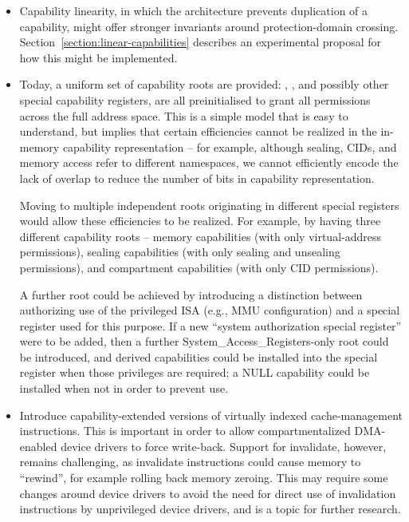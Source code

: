 \begin{itemize}
\item Capability linearity, in which the architecture prevents duplication of
  a capability, might offer stronger invariants around protection-domain
  crossing.
  Section~\ref{section:linear-capabilities} describes an experimental proposal
  for how this might be implemented.

\item Today, a uniform set of capability roots are provided: \PCC{}, \DDC{},
  and possibly other special capability registers, are all
  preinitialised to grant all permissions across the full address space.
  This is a simple model that is easy to understand, but implies that certain
  efficiencies cannot be realized in the in-memory capability representation --
  for example, although sealing, CIDs, and memory access refer to different
  namespaces, we cannot efficiently encode
the
  lack of overlap to reduce the number of bits in capability representation.

  Moving to multiple independent roots originating in different special
  registers would allow these efficiencies to be realized.
  For example, by having three different capability roots -- memory
  capabilities (with only virtual-address permissions), sealing capabilities
  (with only sealing and unsealing permissions), and compartment capabilities
  (with only CID permissions).

  A further root could be achieved by introducing a distinction between \PCC{}
  authorizing use of the privileged ISA (e.g., MMU configuration) and a special
  register used for this purpose.
  If a new ``system authorization special register'' were to be added, then a
  further System\_Access\_Registers-only root could be introduced, and derived
  capabilities could be installed into the special register when those
  privileges are required; a NULL capability could be installed when not in
  order to prevent use.

\item Introduce capability-extended versions of virtually indexed
  cache-management instructions.
  This is important in order to allow compartmentalized DMA-enabled device
  drivers to force write-back.
  Support for invalidate, however, remains challenging, as invalidate
  instructions could cause memory to ``rewind'', for example rolling back
  memory zeroing.
  This may require some changes around device drivers to avoid the need for
  direct use of invalidation instructions by unprivileged device drivers, and
  is a topic for further research.
\end{itemize}
